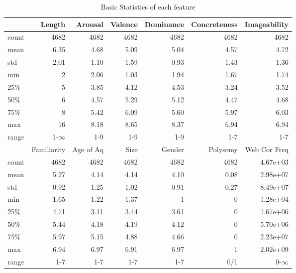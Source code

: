 \documentclass[a4paper,11pt,dvipsnames]{article}
\begin{document}
\begin{table}[h]
    \centering
\begin{tabular}{l|r|r|r|r|r|r}    
{} &       Length &      Arousal &      Valence &    Dominance &  Concreteness &  Imageability \\
\hline
count &  4682  &  4682  &  4682  &  4682  &   4682  &   4682  \\
mean  &     6.35 &     4.68 &     5.09 &     5.04 &      4.57 &      4.72 \\
std   &     2.01 &     1.10 &     1.59 &     0.93 &      1.43  &      1.36 \\
min   &     2  &     2.06 &     1.03 &     1.94 &      1.67 &      1.74 \\
25\%   &     5  &     3.85 &     4.12 &     4.53 &      3.24 &      3.52 \\
50\%   &     6  &     4.57 &     5.29 &     5.12 &      4.47 &      4.68 \\
75\%   &     8  &     5.42 &     6.09 &     5.60 &      5.97 &      6.03 \\
max   &    16  &     8.18 &     8.65 &     8.37 &      6.94 &      6.94 \\
range & 1-$\infty$ & 1-9 & 1-9 & 1-9 & 1-7 & 1-7 \\
\hline
\hline
{} &  Familiarity & Age of Aq &      Size &       Gender &     Polysemy &  Web Cor Freq \\
\hline
count &  4682  &  4682  &  4682  &  4682  &  4682  &     4.67e+03 \\
mean  &     5.27 &     4.14 &     4.14 &     4.10 &     0.08  &     2.98e+07 \\
std   &     0.92  &     1.25  &     1.02  &     0.91  &     0.27  &     8.49e+07 \\
min   &     1.65 &     1.22 &     1.37 &     1  &     0  &     1.28e+04 \\
25\%   &     4.71 &     3.11  &     3.44 &     3.61 &     0  &     1.67e+06 \\
50\%   &     5.44 &     4.18 &     4.19 &     4.12 &     0  &     5.70e+06 \\
75\%   &     5.97 &     5.15 &     4.88 &     4.66 &     0  &     2.23e+07 \\
max   &     6.94 &     6.97 &     6.91 &     6.97 &     1  &     2.02e+09 \\
range & 1-7 & 1-7 & 1-7 & 1-7 & 0/1 & 0-$\infty$ \\
\hline
\end{tabular}
\caption{Basic Statistics of each feature}\label{tab:stat}

\end{table}
%
\end{document}
